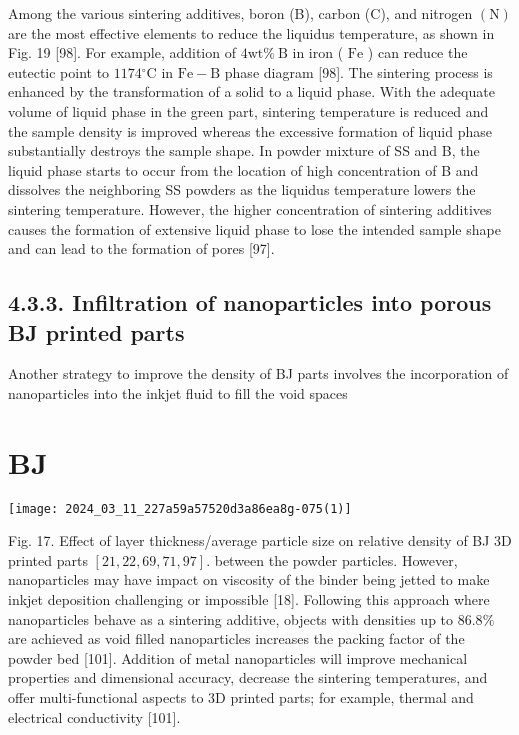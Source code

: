 \documentclass[10pt]{article}
\begin{document}
Among the various sintering additives, boron (B), carbon (C), and nitrogen $(\mathrm{N})$ are the most effective elements to reduce the liquidus temperature, as shown in Fig. 19 [98]. For example, addition of $4 \mathrm{wt} \% \mathrm{~B}$ in iron ( $\mathrm{Fe}$ ) can reduce the eutectic point to $1174{ }^{\circ} \mathrm{C}$ in $\mathrm{Fe}-\mathrm{B}$ phase diagram [98]. The sintering process is enhanced by the transformation of a solid to a liquid phase. With the adequate volume of liquid phase in the green part, sintering temperature is reduced and the sample density is improved whereas the excessive formation of liquid phase substantially destroys the sample shape. In powder mixture of SS and B, the liquid phase starts to occur from the location of high concentration of B and dissolves the neighboring SS powders as the liquidus temperature lowers the sintering temperature. However, the higher concentration of sintering additives causes the formation of extensive liquid phase to lose the intended sample shape and can lead to the formation of pores [97].

\subsection*{4.3.3. Infiltration of nanoparticles into porous BJ printed parts}
Another strategy to improve the density of BJ parts involves the incorporation of nanoparticles into the inkjet fluid to fill the void spaces

\section*{BJ}
\begin{center}
\texttt{[image: 2024\_03\_11\_227a59a57520d3a86ea8g-075(1)]}
\end{center}

Fig. 17. Effect of layer thickness/average particle size on relative density of BJ 3D printed parts $[21,22,69,71,97]$. between the powder particles. However, nanoparticles may have impact on viscosity of the binder being jetted to make inkjet deposition challenging or impossible [18]. Following this approach where nanoparticles behave as a sintering additive, objects with densities up to $86.8 \%$ are achieved as void filled nanoparticles increases the packing factor of the powder bed [101]. Addition of metal nanoparticles will improve mechanical properties and dimensional accuracy, decrease the sintering temperatures, and offer multi-functional aspects to 3D printed parts; for example, thermal and electrical conductivity [101].
\end{document}
